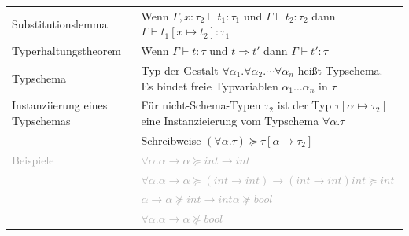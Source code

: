 \documentclass{Zusammenfassung}
\begin{document}
\begin{table}[H]
    \centering
    \begin{tabularx}{\textwidth}{lX}
        Substitutionslemma & Wenn $\Gamma,x:\tau_2\vdash{}t_1:\tau_1$ und $\Gamma\vdash{}t_2:\tau_2$ dann $\Gamma\vdash{}t_1[x\mapsto{}t_2]:\tau_1$\\
        Typerhaltungstheorem & Wenn $\Gamma\vdash{}t:\tau$ und $t\Rightarrow{}t'$ dann $\Gamma\vdash{}t':\tau$\\
        Typschema & Typ der Gestalt $\forall\alpha_1.\forall\alpha_2.\cdots\forall\alpha_n$ heißt Typschema.
        Es bindet freie Typvariablen $\alpha_1\dots\alpha_n$ in $\tau$\\
        Instanziierung eines Typschemas & Für nicht-Schema-Typen $\tau_2$ ist der Typ $\tau[\alpha\mapsto\tau_2]$ eine Instanzieierung vom Typschema $\forall\alpha.\tau$\\
        &Schreibweise $(\forall\alpha.\tau)\succeq\tau[\alpha\rightarrow\tau_2]$\\
        \textcolor{darkgray}{Beispiele} & \textcolor{darkgray}{$\forall\alpha.\alpha\rightarrow\alpha\succeq{}int\rightarrow{}int$}\\
        &\textcolor{darkgray}{$\forall\alpha.\alpha\rightarrow\alpha\succeq{}(int\rightarrow{}int)\rightarrow(int\rightarrow{}int)$\quad$int\succeq{}int$}\\
        &\textcolor{darkgray}{$\alpha\rightarrow\alpha\nsucceq{}int\rightarrow{}int$\quad$\alpha\nsucceq{}bool$}\\
        &\textcolor{darkgray}{$\forall\alpha.\alpha\rightarrow\alpha\nsucceq{}bool$}\\
    \end{tabularx}
    \label{tab:3}
\end{table}
\newpage
\end{document}
